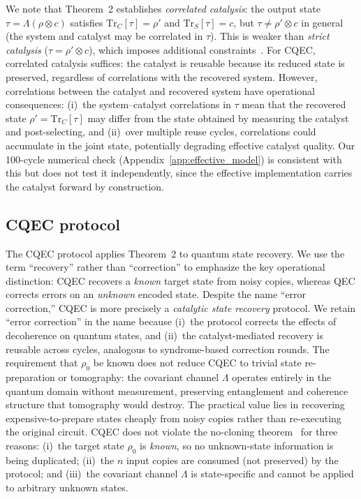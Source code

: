 \documentclass[pra,twocolumn,superscriptaddress,longbibliography,floatfix]{revtex4-2}
\begin{document}
We note that Theorem~2 establishes \emph{correlated catalysis}: the output state $\tau = \Lambda(\rho \otimes c)$ satisfies $\mathrm{Tr}_C[\tau] = \rho'$ and $\mathrm{Tr}_S[\tau] = c$, but $\tau \neq \rho' \otimes c$ in general (the system and catalyst may be correlated in $\tau$).
This is weaker than \emph{strict catalysis} ($\tau = \rho' \otimes c$), which imposes additional constraints~\cite{Shiraishi2024}.
For CQEC, correlated catalysis suffices: the catalyst is reusable because its reduced state is preserved, regardless of correlations with the recovered system.
However, correlations between the catalyst and recovered system have operational consequences: (i)~the system--catalyst correlations in $\tau$ mean that the recovered state $\rho' = \mathrm{Tr}_C[\tau]$ may differ from the state obtained by measuring the catalyst and post-selecting, and (ii)~over multiple reuse cycles, correlations could accumulate in the joint state, potentially degrading effective catalyst quality.
Our 100-cycle numerical check (Appendix~\ref{app:effective_model}) is consistent with this but does not test it independently, since the effective implementation carries the catalyst forward by construction.


\subsection{CQEC protocol}
\label{sec:cqec_protocol}

The CQEC protocol applies Theorem~2 to quantum state recovery.
We use the term ``recovery'' rather than ``correction'' to emphasize the key operational distinction: CQEC recovers a \emph{known} target state from noisy copies, whereas QEC corrects errors on an \emph{unknown} encoded state.
Despite the name ``error correction,'' CQEC is more precisely a \emph{catalytic state recovery} protocol.
We retain ``error correction'' in the name because (i)~the protocol corrects the effects of decoherence on quantum states, and (ii)~the catalyst-mediated recovery is reusable across cycles, analogous to syndrome-based correction rounds.
The requirement that $\rho_0$ be known does not reduce CQEC to trivial state re-preparation or tomography: the covariant channel $\Lambda$ operates entirely in the quantum domain without measurement, preserving entanglement and coherence structure that tomography would destroy.
The practical value lies in recovering expensive-to-prepare states cheaply from noisy copies rather than re-executing the original circuit.
CQEC does not violate the no-cloning theorem~\cite{Wootters1982} for three reasons: (i)~the target state $\rho_0$ is \emph{known}, so no unknown-state information is being duplicated; (ii)~the $n$ input copies are consumed (not preserved) by the protocol; and (iii)~the covariant channel $\Lambda$ is state-specific and cannot be applied to arbitrary unknown states.
\end{document}

